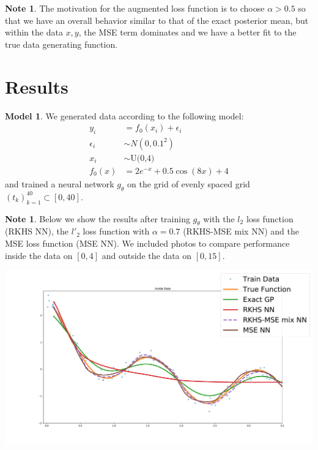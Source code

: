 \documentclass{article}
\theoremstyle{definition}
\newtheorem{note}[definition]{Note}
\newtheorem{modl}[definition]{Model}
\newcommand{\al}{\alpha}
\newcommand{\ep}{\epsilon}
\begin{document}
\begin{note}
The motivation for the augmented loss function is to choose $\al > 0.5$ so that we have an overall behavior similar to that of the exact posterior mean, but within the data $x,y$, the MSE term dominates and we have a better fit to the true data generating function. 
\end{note}



\section{Results}

\begin{modl}
We generated data according to the following model:
\begin{align*}
y_i &= f_0(x_i) + \ep_i \\
\ep_i &\sim N(0, 0.1^2) \\
x_i & \sim \text{U(0,4)} \\
f_0(x) &= 2e^{-x} +  0.5 \cos(8x) + 4
\end{align*}
and trained a neural network $g_{\theta}$ on the grid of evenly spaced grid $(t_k)_{k=1}^{40} \subset [0,40]$.
\end{modl}

\begin{note}
Below we show the results after training $g_{\theta}$ with the $l_2$ loss function (RKHS NN), the $l'_2$ loss function with $\al = 0.7$ (RKHS-MSE mix NN) and the MSE loss function (MSE NN). We included photos to compare performance inside the data on $[0,4]$ and outside the data on $[0, 15]$. 
\end{note}


\includegraphics[scale=.35]{inside_data.pdf}
\end{document}
